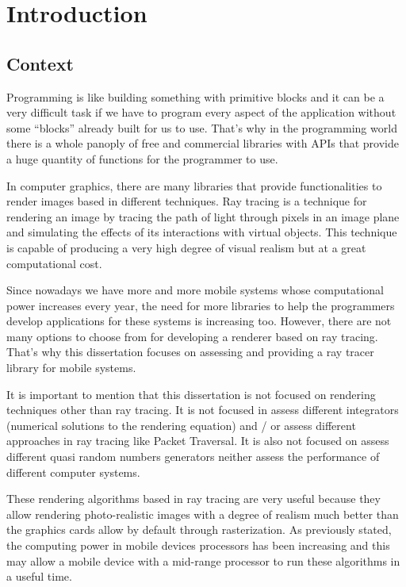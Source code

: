 \chapter{Introduction}

\section{Context}

\par
Programming is like building something with primitive blocks and it can be a very difficult task if we have to program every aspect of the application without some “blocks” already built for us to use.
That’s why in the programming world there is a whole panoply of free and commercial libraries with APIs that provide a huge quantity of functions for the programmer to use.

\par
In computer graphics, there are many libraries that provide functionalities to render images based in different techniques.
Ray tracing is a technique for rendering an image by tracing the path of light through pixels in an image plane and simulating the effects of its interactions with virtual objects.
This technique is capable of producing a very high degree of visual realism but at a great computational cost.

\par
Since nowadays we have more and more mobile systems whose computational power increases every year, the need for more libraries to help the programmers develop applications for these systems is increasing too.
However, there are not many options to choose from for developing a renderer based on ray tracing.
That’s why this dissertation focuses on assessing and providing a ray tracer library for mobile systems.

\par
It is important to mention that this dissertation is not focused on rendering techniques other than ray tracing.
It is not focused in assess different integrators (numerical solutions to the rendering equation) and / or assess different approaches in ray tracing like Packet Traversal.
It is also not focused on assess different quasi random numbers generators neither assess the performance of different computer systems.

\par
These rendering algorithms based in ray tracing are very useful because they allow rendering photo-realistic images with a degree of realism much better than the graphics cards allow by default through rasterization.
As previously stated, the computing power in mobile devices processors has been increasing and this may allow a mobile device with a mid-range processor to run these algorithms in a useful time.

